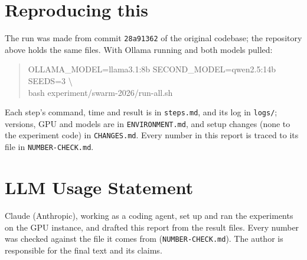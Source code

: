 \documentclass[11pt]{article}
\begin{document}
\section{Reproducing this}
The run was made from commit \texttt{28a91362} of the original codebase; the repository above holds the same files.
With Ollama running and both models pulled:
\begin{quote}\small\ttfamily
OLLAMA\_MODEL=llama3.1:8b SECOND\_MODEL=qwen2.5:14b SEEDS=3 \textbackslash\\
\hspace*{1.5em}bash experiment/swarm-2026/run-all.sh
\end{quote}
Each step's command, time and result is in \texttt{steps.md}, and its log in \texttt{logs/}; versions, GPU and models are
in \texttt{ENVIRONMENT.md}, and setup changes (none to the experiment code) in \texttt{CHANGES.md}. Every number in this
report is traced to its file in \texttt{NUMBER-CHECK.md}.

\section*{LLM Usage Statement}
Claude (Anthropic), working as a coding agent, set up and ran the experiments on the GPU instance, and drafted this report
from the result files. Every number was checked against the file it comes from (\texttt{NUMBER-CHECK.md}). The author
is responsible for the final text and its claims.
\end{document}
